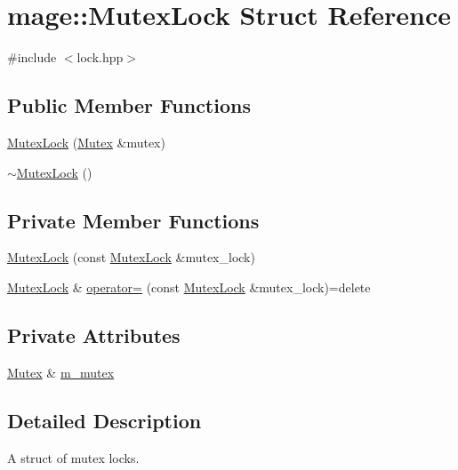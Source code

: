 \hypertarget{structmage_1_1_mutex_lock}{}\section{mage\+:\+:Mutex\+Lock Struct Reference}
\label{structmage_1_1_mutex_lock}


{\ttfamily \#include $<$lock.\+hpp$>$}

\subsection*{Public Member Functions}
\begin{DoxyCompactItemize}
\item 
\hyperlink{structmage_1_1_mutex_lock_aa8cd93677eec2656ca217fdf79f911c4}{Mutex\+Lock} (\hyperlink{classmage_1_1_mutex}{Mutex} \&mutex)
\item 
\hyperlink{structmage_1_1_mutex_lock_a2631e8878646b2d25b136b6adb55d553}{$\sim$\+Mutex\+Lock} ()
\end{DoxyCompactItemize}
\subsection*{Private Member Functions}
\begin{DoxyCompactItemize}
\item 
\hyperlink{structmage_1_1_mutex_lock_a9bfeb564ac4563e10d8fe569870d0e18}{Mutex\+Lock} (const \hyperlink{structmage_1_1_mutex_lock}{Mutex\+Lock} \&mutex\+\_\+lock)
\item 
\hyperlink{structmage_1_1_mutex_lock}{Mutex\+Lock} \& \hyperlink{structmage_1_1_mutex_lock_a739909161a9a9ca0fc8143ac84967765}{operator=} (const \hyperlink{structmage_1_1_mutex_lock}{Mutex\+Lock} \&mutex\+\_\+lock)=delete
\end{DoxyCompactItemize}
\subsection*{Private Attributes}
\begin{DoxyCompactItemize}
\item 
\hyperlink{classmage_1_1_mutex}{Mutex} \& \hyperlink{structmage_1_1_mutex_lock_a1c796e1e66bd49007fe746d1425b82f4}{m\+\_\+mutex}
\end{DoxyCompactItemize}


\subsection{Detailed Description}
A struct of mutex locks. 

